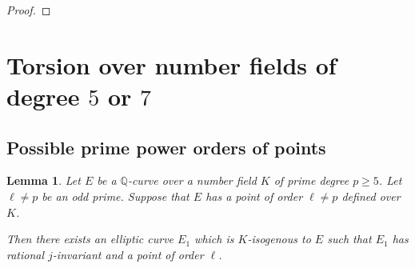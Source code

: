 \documentclass[10pt,leqno]{amsart}
\newcommand{\Q}{\mathbb{Q}}
\newtheorem{lemma}[theorem]{Lemma}
\theoremstyle{definition}
\theoremstyle{remark}
\numberwithin{theorem}{section}
\begin{document}
\begin{proof}
\end{proof}

\section{Torsion over number fields of degree $5$ or $7$}\label{case57}

\subsection{Possible prime power orders of points}


\begin{lemma}\label{twist-dualno}
    Let $E$ be a $\Q$-curve over a number field $K$ of prime degree $p\geq 5$. Let $\ell \neq p$ be an odd prime. Suppose that $E$ has a point of order $\ell \neq p$ defined over $K$.
    
      Then there exists an elliptic curve $E_1$ which is $K$-isogenous to $E$ such that $E_1$ has rational $j$-invariant and a point of order $\ell$.
\end{lemma}
\end{document}
